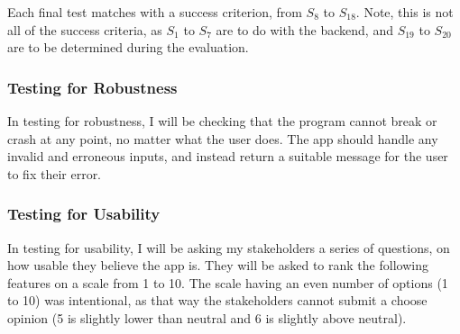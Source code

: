 \documentclass[12pt]{report}
\begin{document}
Each final test matches with a success criterion, from $S_{8}$ to $S_{18}$. Note, this is not all of the success criteria, as $S_{1}$ to $S_{7}$ are to do with the backend, and $S_{19}$ to $S_{20}$ are to be determined during the evaluation.

\subsubsection{Testing for Robustness}
In testing for robustness, I will be checking that the program cannot break or crash at any point, no matter what the user does. The app should handle any invalid and erroneous inputs, and instead return a suitable message for the user to fix their error.

\begin{center}
\end{center}

\subsubsection{Testing for Usability}
In testing for usability, I will be asking my stakeholders a series of questions, on how usable they believe the app is. They will be asked to rank the following features on a scale from 1 to 10. The scale having an even number of options (1 to 10) was intentional, as that way the stakeholders cannot submit a choose opinion (5 is slightly lower than neutral and 6 is slightly above neutral).

\begin{center}
\end{center}
\end{document}
